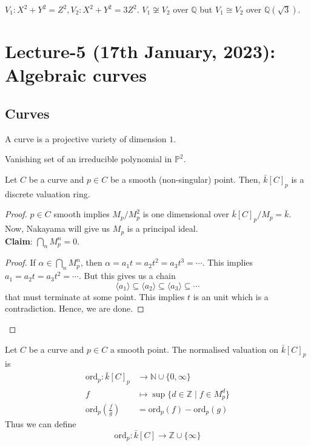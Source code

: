 \documentclass[oneside, 12pt, ]{scrbook}
\newcommand{\NN}{\mathbb N}
\newcommand{\QQ}{\mathbb Q}
\newcommand{\ZZ}{\mathbb Z}
\newcommand{\PP}{\mathbb{P}}
\theoremstyle{theorem}
\begin{document}
\begin{example}
$V_{1}: X^2 + Y^2 = Z^2 , V_{2}: X^2 + Y^2 = 3Z^2$. $V_{1} \not \cong V_{2}$ over $\QQ$ but $V_{1}\cong V_{2}$ over $\QQ(\sqrt{3})$.
\end{example}

\chapter{Lecture-5 (17th January, 2023): Algebraic curves}

\section{Curves}

\begin{definition}
A curve is a projective variety of dimension $1$.
\end{definition}

\begin{example}
Vanishing set of an irreducible polynomial in $\PP^2$.
\end{example}

\begin{proposition}
Let $C$ be a curve and $p \in C$ be a smooth (non-singular) point. Then, $\bar{k}[C]_{p}$ is a discrete valuation ring.
\end{proposition}

\begin{proof}
$p \in C$ smooth implies $M_{p}/M_{p}^2$ is one dimensional over $\bar{k}[C]_{p}/M_{p} = \bar{k}$. Now, Nakayama will give us $M_{p}$ is a principal ideal. \\

\textbf{Claim}:
$\bigcap_{n} M_{p}^n = 0$.

\begin{proof}
If $\alpha \in \bigcap_{n} M_{p}^n$, then $\alpha = a_{1}t = a_{2} t^2 = a_{3} t^3 = \cdots $. This implies $a_{1} = a_{2}t = a_{3}t^2 = \cdots $. But this gives us a chain $$\langle a_{1} \rangle \subseteq \langle a_{2} \rangle \subseteq \langle a_{3} \rangle \subseteq \cdots $$ that must terminate at some point. This implies $t$ is an unit which is a contradiction. Hence, we are done.
\end{proof}
\end{proof}

\begin{definition}
Let $C$ be a curve and $p \in C$ a smooth point. The normalised valuation on $\bar{k}[C]_{p}$ is 
\begin{align*}
\mathrm{ord}_{p}: \bar{k}[C]_{p} &\rightarrow \NN \cup \{0, \infty\} \\
f &\mapsto \sup \{d \in \ZZ \mid f \in M_{p}^d \} \\
\mathrm{ord}_{p}(\frac{f}{g}) &= \mathrm{ord}_{p}(f) - \mathrm{ord}_{p}(g)
\end{align*}
Thus we can define $$\mathrm{ord}_{p} : \bar{k}[C] \rightarrow \ZZ \cup \{\infty\}$$
\end{definition}
\end{document}
